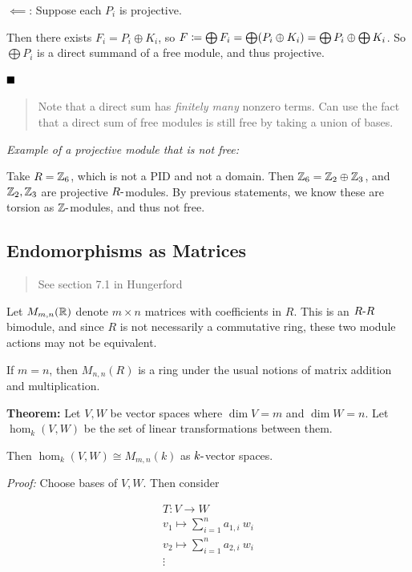 \(\impliedby\): Suppose each \(P_i\) is projective.

Then there exists \(F_i = P_i \oplus K_i\), so
\(F \coloneqq \bigoplus F_i = \bigoplus (P_i \oplus K_i) = \bigoplus P_i \oplus \bigoplus K_i\).
So \(\bigoplus P_i\) is a direct summand of a free module, and thus
projective.

\(\qed\)

\begin{quote}
Note that a direct sum has \emph{finitely many} nonzero terms. Can use
the fact that a direct sum of free modules is still free by taking a
union of bases.
\end{quote}

\emph{Example of a projective module that is not free:}

Take \(R = {\mathbb{Z}}_6\), which is not a PID and not a domain. Then
\({\mathbb{Z}}_6 = {\mathbb{Z}}_2 \oplus {\mathbb{Z}}_3\), and \({\mathbb{Z}}_2, {\mathbb{Z}}_3\) are projective
\(R{\hbox{-}}\)modules. By previous statements, we know these are torsion as
\({\mathbb{Z}}{\hbox{-}}\)modules, and thus not free.

\hypertarget{endomorphisms-as-matrices}{%
\subsection{Endomorphisms as Matrices}\label{endomorphisms-as-matrices}}

\begin{quote}
See section 7.1 in Hungerford
\end{quote}

Let \(M_{m, n}({\mathbb{R}})\) denote \(m\times n\) matrices with coefficients in
\(R\). This is an \(R{\hbox{-}} R\) bimodule, and since \(R\) is not
necessarily a commutative ring, these two module actions may not be
equivalent.

If \(m=n\), then \(M_{n,n}(R)\) is a ring under the usual notions of
matrix addition and multiplication.

\textbf{Theorem:} Let \(V, W\) be vector spaces where \(\dim V = m\) and
\(\dim W = n\). Let \(\hom_k(V, W)\) be the set of linear
transformations between them.

Then \(\hom_k(V, W) \cong M_{m, n}(k)\) as \(k{\hbox{-}}\)vector spaces.

\emph{Proof:} Choose bases of \(V, W\). Then consider

\begin{align*}
T: V \to W \\
v_1 \mapsto \sum_{i=1}^n a_{1, i} ~w_i \\
v_2 \mapsto \sum_{i=1}^n a_{2, i} ~w_i \\
\vdots
\end{align*}

